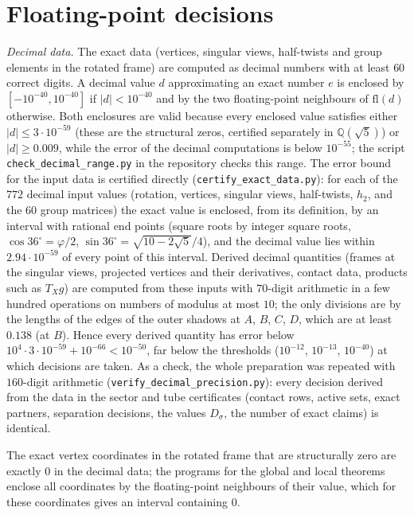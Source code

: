 \documentclass[11pt]{amsart}
\theoremstyle{definition}
\newcommand{\Q}{\mathbb{Q}}
\newcommand{\sq}{\sqrt5}
\newcommand{\gr}{\varphi}          %
\newcommand{\abs}[1]{\lvert #1\rvert}
\begin{document}
\section{Floating-point decisions}\label{app:float}
\emph{Decimal data.} The exact data (vertices, singular views, half-twists and group elements in the rotated frame)
are computed as decimal numbers with at least $60$ correct digits. A decimal value $d$ approximating an exact number $e$
is enclosed by $[-10^{-40},10^{-40}]$ if $\abs d<10^{-40}$ and by the two floating-point neighbours of $\mathrm{fl}(d)$
otherwise. Both enclosures are valid because every enclosed value satisfies either $\abs d\le3\cdot10^{-59}$ (these are
the structural zeros, certified separately in $\Q(\sq)$) or $\abs d\ge0.009$, while the error of the decimal
computations is below $10^{-55}$; the script \texttt{check\_decimal\_range.py} in the repository checks this range.
The error bound for the input data is certified directly (\texttt{certify\_exact\_data.py}): for each of the $772$
decimal input values (rotation, vertices, singular views, half-twists, $h_2$, and the $60$ group matrices) the exact value
is enclosed, from its definition, by an interval with rational end points (square roots by integer square roots,
$\cos36^\circ=\gr/2$, $\sin36^\circ=\sqrt{10-2\sq}/4$), and the decimal value lies within $2.94\cdot10^{-59}$ of every
point of this interval. Derived decimal quantities (frames at the singular views, projected vertices and their
derivatives, contact data, products such as $T_Xg$) are computed from these inputs with $70$-digit arithmetic in a few
hundred operations on numbers of modulus at most $10$; the only divisions are by the lengths of the edges of the outer
shadows at $A$, $B$, $C$, $D$, which are at least $0.138$ (at $B$). Hence every derived quantity has error below
$10^{4}\cdot3\cdot10^{-59}+10^{-66}<10^{-50}$, far below the thresholds ($10^{-12}$, $10^{-13}$, $10^{-40}$) at which
decisions are taken. As a check, the whole preparation was repeated with
$160$-digit arithmetic
(\texttt{verify\_decimal\_precision.py}): every decision derived from the data in the sector and tube certificates
(contact rows, active sets, exact partners, separation decisions, the values $D_\sigma$, the number of exact claims) is
identical.

The exact vertex coordinates in the rotated frame that are structurally zero are exactly $0$ in the decimal data; the
programs for the global and local theorems enclose all coordinates by the floating-point neighbours of their value,
which for these coordinates gives an interval containing $0$.
\end{document}

